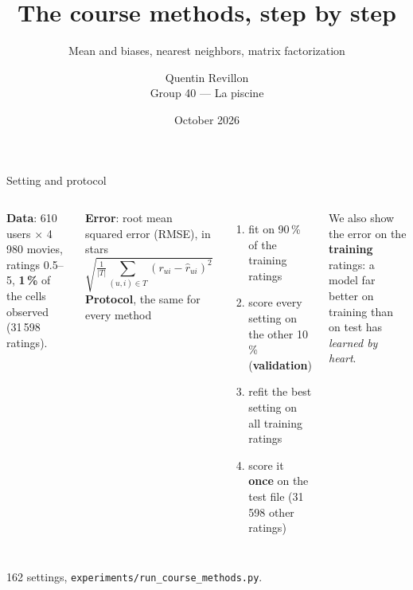 \documentclass[aspectratio=169,11pt]{beamer}
\title{The course methods, step by step}
\subtitle{Mean and biases, nearest neighbors, matrix factorization}
\author{Quentin Revillon\\[2pt] {\small Group 40 --- La piscine}}
\institute{DataLab A1 --- Master IASD}
\date{October 2026}
\newcommand{\key}[1]{\textcolor{accent}{\textbf{#1}}}
\newcommand{\muted}[1]{\textcolor{soft}{#1}}
\begin{document}
\begin{frame}
\titlepage
\end{frame}

\begin{frame}{Setting and protocol}
\begin{columns}[T]
\textbf{Data}: 610 users $\times$ 4\,980 movies, ratings 0.5--5,
\key{1\,\%} of the cells observed (31\,598 ratings).

\vspace{0.6em}
\textbf{Error}: root mean squared error (RMSE), in stars
\[
  \sqrt{\tfrac{1}{|T|}\textstyle\sum_{(u,i)\in T} (r_{ui} - \hat r_{ui})^2}
\]
\textbf{Protocol}, the same for every method
\begin{enumerate}\small
  \item fit on 90\,\% of the training ratings
  \item score every setting on the other 10\,\% (\key{validation})
  \item refit the best setting on all training ratings
  \item score it \key{once} on the test file (31\,598 other ratings)
\end{enumerate}
\vspace{0.3em}
\small We also show the error on the \key{training} ratings: a model far better on
training than on test has \emph{learned by heart}.
\end{columns}
\vfill
\muted{\footnotesize 162 settings, \texttt{experiments/run\_course\_methods.py}.}
\end{frame}
\end{document}
